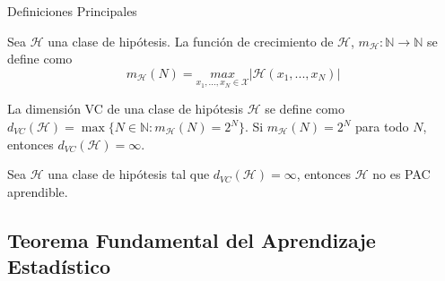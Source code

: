 \begin{frame}{Definiciones Principales}
    
    \begin{definition}
         Sea $\mathcal{H}$ una clase de hipótesis. La función de crecimiento de $\mathcal{H}$, $m_{\mathcal{H}}:\mathbb{N} \to \mathbb{N}$ se define como 
         \begin{equation}
         m_{\mathcal{H}}(N) = \underset{x_1,...,x_N \in \mathcal{X}}{max} |\mathcal{H}(x_1,...,x_N)|
         \end{equation}
     \end{definition}
     
    \pause
     
    \begin{definition}
    La dimensión VC de una clase de hipótesis $\mathcal{H}$ se define como  ${d_{VC}(\mathcal{H}) = \max \{N \in \mathbb{N} : m_{\mathcal{H}}(N) = 2^N\} }$. Si $m_{\mathcal{H}}(N) = 2^N$ para todo $N$, entonces $d_{VC}(\mathcal{H}) = \infty$.
    \end{definition}
    
    \pause
    
    \begin{proposition}
    Sea $\mathcal{H}$ una clase de hipótesis tal que $d_{VC}(\mathcal{H}) = \infty$, entonces $\mathcal{H}$ no es PAC aprendible.
    \end{proposition}
    
\end{frame}     


\subsection{Teorema Fundamental del Aprendizaje Estadístico}

